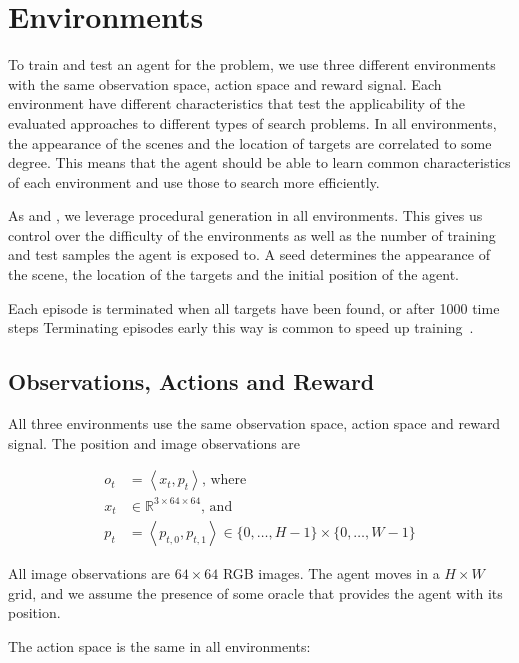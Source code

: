 \section{Environments}
\label{sec:environments}

To train and test an agent for the problem, we use three different environments with the same observation space, action space and reward signal.
Each environment have different characteristics that test the applicability of the evaluated approaches to different types of search problems.
In all environments, the appearance of the scenes and the location of targets are correlated to some degree.
This means that the agent should be able to learn common characteristics of each environment and use those to search more efficiently.

As \cite{cobbe_leveraging_2020} and \cite{mnih_asynchronous_2016}, we leverage procedural generation in all environments.
This gives us control over the difficulty of the environments as well as the number of training and test samples the agent is exposed to.
A seed determines the appearance of the scene, the location of the targets and the initial position of the agent.

Each episode is terminated when all targets have been found, or after 1000 time steps
Terminating episodes early this way is common to speed up training~\cite{pardo_time_2018}.

\subsection{Observations, Actions and Reward}

All three environments use the same observation space, action space and reward signal.
The position and image observations are

\begin{align}
    o_t & = \left\langle x_t, p_t \right\rangle \text{, where} \\
    x_t & \in \mathbb{R}^{3 \times 64 \times 64} \text{, and} \\
    p_t & = \left\langle p_{t,0}, p_{t,1} \right\rangle \in \{0, \dots, H-1\} \times \{0, \dots, W-1\}
\end{align}

All image observations are \(64 \times 64\) RGB images.
The agent moves in a \(H \times W\) grid, and we assume the presence of some oracle that provides the agent with its position.

The action space is the same in all environments:

